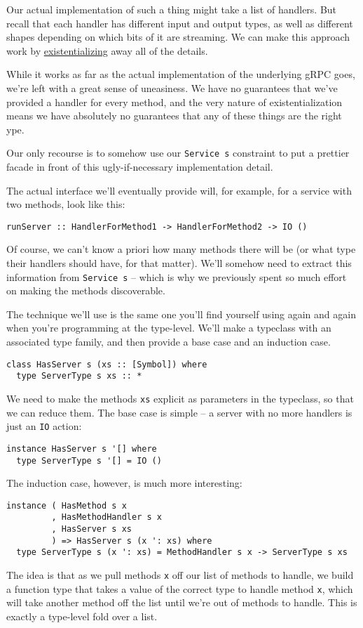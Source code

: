 Our actual implementation of such a thing might take a list of handlers. But recall that each handler has different input and output types, as well as different shapes depending on which bits of it are streaming. We can make this approach work by \href{http://reasonablypolymorphic.com/existentialization/}{existentializing} away all of the details.

While it works as far as the actual implementation of the underlying gRPC goes, we're left with a great sense of uneasiness. We have no guarantees that we've provided a handler for every method, and the very nature of existentialization means we have absolutely no guarantees that any of these things are the right ype.

Our only recourse is to somehow use our \texttt{Service s} constraint to put a prettier facade in front of this ugly-if-necessary implementation detail.

The actual interface we'll eventually provide will, for example, for a service with two methods, look like this:

\begin{verbatim}
runServer :: HandlerForMethod1 -> HandlerForMethod2 -> IO ()
\end{verbatim}
Of course, we can't know a priori how many methods there will be (or what type their handlers should have, for that matter). We'll somehow need to extract this information from \texttt{Service s} -- which is why we previously spent so much effort on making the methods discoverable.

The technique we'll use is the same one you'll find yourself using again and again when you're programming at the type-level. We'll make a typeclass with an associated type family, and then provide a base case and an induction case.

\begin{verbatim}
class HasServer s (xs :: [Symbol]) where
  type ServerType s xs :: *
\end{verbatim}
We need to make the methods \texttt{xs} explicit as parameters in the typeclass, so that we can reduce them. The base case is simple -- a server with no more handlers is just an \texttt{IO} action:

\begin{verbatim}
instance HasServer s '[] where
  type ServerType s '[] = IO ()
\end{verbatim}
The induction case, however, is much more interesting:

\begin{verbatim}
instance ( HasMethod s x
         , HasMethodHandler s x
         , HasServer s xs
         ) => HasServer s (x ': xs) where
  type ServerType s (x ': xs) = MethodHandler s x -> ServerType s xs
\end{verbatim}
The idea is that as we pull methods \texttt{x} off our list of methods to handle, we build a function type that takes a value of the correct type to handle method \texttt{x}, which will take another method off the list until we're out of methods to handle. This is exactly a type-level fold over a list.

